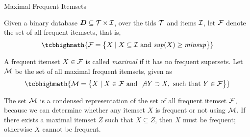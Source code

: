 
\date{Chapter 9: Summarizing Itemsets}

\begin{frame}
\titlepage
\end{frame}


\newcommand{\alggenmax}{\textsc{GenMax}\xspace}
\newcommand{\algcharm}{\textsc{Charm}\xspace}
\newcommand{\algndi}{\textsc{NDI}\xspace}
\newcommand{\algcomputebounds}{\textsc{ComputeBounds}\xspace}


\begin{frame}{Maximal Frequent Itemsets}

Given a binary database ${\boldsymbol D} \subseteq {\mathcal T} \times {\mathcal I}$,
over the tids ${\mathcal T}$ and items ${\mathcal I}$, let ${\mathcal F}$
denote the set of all frequent itemsets, that is,
\begin{align*}
\tcbhighmath{
\cF = \bigl\{X \mid X \subseteq \cI \mbox{ and } \supp(X) \ge \minsup
\bigr\}
}
\end{align*}

\medskip
A frequent itemset $X \in {\mathcal F}$ is called {\em maximal}
if it has no
frequent supersets. Let ${\mathcal M}$ be the set of all maximal frequent
itemsets, given as
\begin{align*}
\tcbhighmath{
\cM = \bigl\{X \mid X \in \cF \mbox{ and } \not\exists Y \supset X, \mbox{
  such that } Y \in \cF \bigr\}
}
\end{align*}

\medskip
The set ${\mathcal M}$ is a condensed representation of the set of all frequent
itemset ${\mathcal F}$, because we can determine whether any itemset $X$ is
frequent or not using ${\mathcal M}$. If there exists a maximal itemset $Z$ such
that $X \subseteq Z$, then $X$ must be frequent; otherwise $X$ cannot be
frequent. 
\end{frame}


